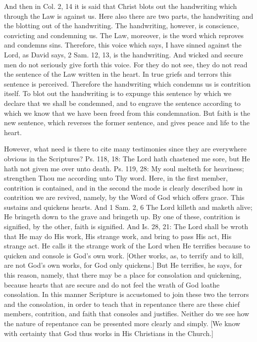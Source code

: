 And then in Col. 2, 14 it is said that Christ blots out the
handwriting which through the Law is against us.  Here also there are
two parts, the handwriting and the blotting out of the handwriting.
The handwriting, however, is conscience, convicting and condemning us.
The Law, moreover, is the word which reproves and condemns sins.
Therefore, this voice which says, I have sinned against the Lord, as
David says, 2 Sam. 12, 13, is the handwriting.  And wicked and secure
men do not seriously give forth this voice.  For they do not see,
they do not read the sentence of the Law written in the heart.  In
true griefs and terrors this sentence is perceived.  Therefore the
handwriting which condemns us is contrition itself.  To blot out the
handwriting is to expunge this sentence by which we declare that we
shall be condemned, and to engrave the sentence according to which we
know that we have been freed from this condemnation.  But faith is
the new sentence, which reverses the former sentence, and gives peace
and life to the heart.

However, what need is there to cite many testimonies since they are
everywhere obvious in the Scriptures?  Ps. 118, 18: The Lord hath
chastened me sore, but He hath not given me over unto death.  Ps. 119,
28: My soul melteth for heaviness; strengthen Thou me according unto
Thy word.  Here, in the first member, contrition is contained, and in
the second the mode is clearly described how in contrition we are
revived, namely, by the Word of God which offers grace.  This
sustains and quickens hearts.  And 1 Sam. 2, 6 The Lord killeth and
maketh alive; He bringeth down to the grave and bringeth up.  By one
of these, contrition is signified, by the other, faith is signified.
And Is. 28, 21: The Lord shall be wroth that He may do His work, His
strange work, and bring to pass His act, His strange act.  He calls
it the strange work of the Lord when He terrifies because to quicken
and console is God's own work.  [Other works, as, to terrify and to
kill, are not God's own works, for God only quickens.] But He
terrifies, he says, for this reason, namely, that there may be a
place for consolation and quickening, because hearts that are secure
and do not feel the wrath of God loathe consolation.  In this manner
Scripture is accustomed to join these two the terrors and the
consolation, in order to teach that in repentance there are these
chief members, contrition, and faith that consoles and justifies.
Neither do we see how the nature of repentance can be presented more
clearly and simply.  [We know with certainty that God thus works in
His Christians in the Church.]

